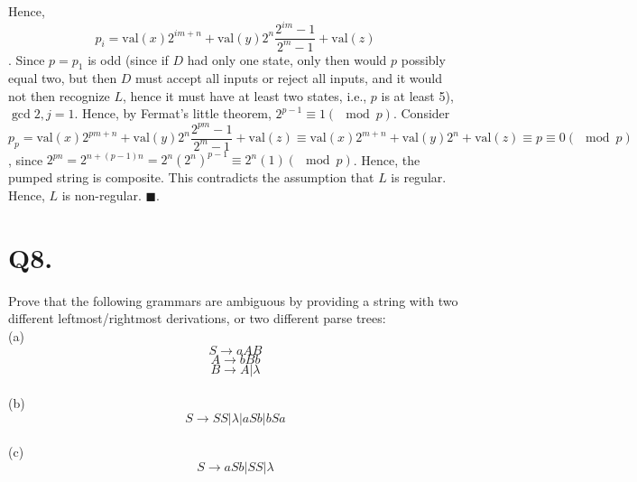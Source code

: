 \documentclass[]{article}
\begin{document}
	Hence, $$p_i = \text{val}(x) 2^{im + n} + \text{val}(y) 2^n \frac{2^{im} - 1}{2^m - 1} + \text{val}(z)$$. Since $p = p_1$ is odd (since if $D$ had only one state, only then would $p$ possibly equal two, but then $D$ must accept all inputs or reject all inputs, and it would not then recognize $L$, hence it must have at least two states, i.e., $p$ is at least 5), $\gcd{2,j} = 1$. Hence, by Fermat's little theorem, $2^{p-1} \equiv 1 (\mod p)$. Consider $$p_p = \text{val}(x) 2^{pm + n} + \text{val}(y) 2^n \frac{2^{pm} - 1}{2^m - 1} + \text{val}(z) \equiv \text{val}(x) 2^{m+n} + \text{val}(y) 2^n + \text{val}(z) \equiv p \equiv 0 (\mod p)$$, since $2^{pn} = 2^{n + (p-1)n} = 2^n (2^n)^{p-1} \equiv 2^n (1) (\mod p)$. Hence, the pumped string is composite. This contradicts the assumption that $L$ is regular. Hence, $L$ is non-regular. $\blacksquare$.
	\pagebreak
	\section*{Q8.}
	Prove that the following grammars are ambiguous by providing a string with two
	different leftmost/rightmost derivations, or two different parse trees: \\
	(a) $$ S \rightarrow aAB $$ $$ A \rightarrow bBb $$ $$B \rightarrow A | \lambda $$ \\
	(b) $$ S \rightarrow SS | \lambda | aSb | bSa $$ \\
	(c) $$ S \rightarrow aSb | SS | \lambda $$
	
\end{document}
